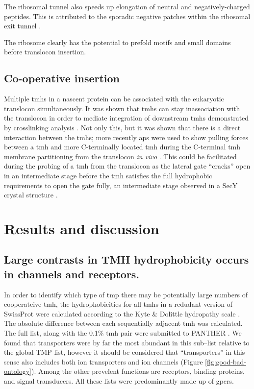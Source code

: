 The ribosomal tunnel also speeds up elongation of neutral and negatively-charged peptides.
This is attributed to the sporadic negative patches within the ribosomal exit tunnel \cite{Lu2008}.

The ribosome clearly has the potential to prefold motifs and small domains before translocon insertion.

\subsection{Co-operative insertion}
Multiple \gls{tmh}s in a nascent protein can be associated with the eukaryotic translocon simultaneously.
It was shown that \gls{tmh}s can stay inassociation with the translocon in order to mediate integration of downstream \gls{tmh}s demonstrated by crosslinking analysis \cite{Sadlish2005, Cross2009}.
Not only this, but it was shown that there is a direct interaction between the \gls{tmh}s; more recently \gls{ap}s were used to show pulling forces between a \gls{tmh} and more C-terminally located \gls{tmh} during the C-terminal \gls{tmh} membrane partitioning from the translocon \textit{in vivo} \cite{Cymer2013}.
This could be facilitated during the probing of a \gls{tmh} from the translocon as the lateral gate ``cracks'' open in an intermediate stage before the \gls{tmh} satisfies the full hydrophobic requirements to open the gate fully, an intermediate stage observed in a SecY crystal structure \cite{Egea2010}.

\section{Results and discussion}

\subsection{Large contrasts in TMH hydrophobicity occurs in channels and receptors.}
In order to identify which type of \gls{tmp} there may be potentially large numbers of cooperateive \gls{tmh}, the hydrophobicities for all \gls{tmh}s in a redudant version of SwissProt were calculated according to the Kyte \& Dolittle hydropathy scale \cite{Kyte1982}.
The absolute difference between each sequentially adjacent \gls{tmh} was calculated.
The full list, along with the 0.1\% \gls{tmh} pair were submitted to PANTHER \cite{Mi2017}.
We found that transporters were by far the most abundant in this sub\---list relative to the global TMP list, however it should be considered that ``transporters'' in this sense also includes both ion transporters and ion channels (Figure \ref{fig:good-bad-ontology}).
Among the other prevelent functions are receptors, binding proteins, and signal transducers.
All these lists were predominantly made up of \gls{gpcr}s.


